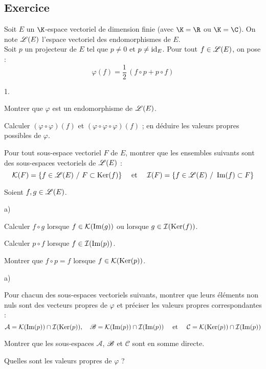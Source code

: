 \documentclass[11pt]{article}%
\begin{document}
\subsection*{Exercice} %
\noindent
Soit $E$ un $\K$-espace vectoriel de dimension finie (avec $\K=\R$ 
ou $\K=\C$). On note $\mathscr{L}(E)$ l'espace vectoriel des endomorphismes de 
$E$.\\
Soit $p$ un projecteur de $E$ tel que $p\neq 0$ et $p\neq {\rm{id}}_E$. Pour 
tout $f\in \mathscr{L}(E)$, on pose :
\[
 \varphi(f)=\dfrac{1}{2} \, (f\circ p +p\circ f)
\]
\begin{noliste}{1.}
 \item Montrer que $\varphi$ est un endomorphisme de $\mathscr{L}(E)$.
 
 \item Calculer $(\varphi \circ \varphi)(f)$ et $(\varphi \circ \varphi 
 \circ \varphi)(f)$ ; en déduire les valeurs propres possibles de 
 $\varphi$.
 
 \item Pour tout sous-espace vectoriel $F$ de $E$, montrer que les 
 ensembles suivants sont des sous-espaces vectoriels de $\mathscr{L}(E)$ :
 \[
  \mathcal{K}(F) = \{f\in \mathscr{L}(E) \ / \ F\subset \operatorname{Ker}(f)\} \quad 
  \mbox{ et } \quad \mathcal{I}(F) = \{f\in\mathscr{L}(E) \ / \ \operatorname{Im}(f) 
  \subset F\}
 \]
 
 \item Soient $f,g \in \mathscr{L}(E)$.
 \begin{noliste}{a)}
  \item Calculer $f\circ g$ lorsque $f\in \mathcal{K}(\operatorname{Im}(g))$ ou
  lorsque $g\in \mathcal{I}(\operatorname{Ker}(f))$.
  
  \item Calculer $p\circ f$ lorsque $f\in \mathcal{I}(\operatorname{Im}(p))$.
  
  \item Montrer que $f\circ p=f$ lorsque $f\in \mathcal{K}(\operatorname{Ker}(p))$.
 \end{noliste}
 
 \item 
 \begin{noliste}{a)}
  \item Pour chacun des sous-espaces vectoriels suivants, montrer que 
  leurs éléments non nuls sont des vecteurs propres de $\varphi$ et 
  préciser les valeurs propres correspondantes :
  \[
   \mathcal{A} = \mathcal{K}(\operatorname{Im}(p)) \cap \mathcal{I}(\operatorname{Ker}(p)), \quad 
   \mathscr{B} = \mathcal{K}(\operatorname{Im}(p)) \cap \mathcal{I}(\operatorname{Im}(p)) \quad \mbox{ et }
   \quad \mathcal{C} = \mathcal{K}(\operatorname{Ker}(p)) \cap \mathcal{I}(\operatorname{Im}(p))
  \]
  
  \item Montrer que les sous-espaces $\mathcal{A}$, $\mathscr{B}$ et 
  $\mathcal{C}$ sont en somme directe.
  
  \item Quelles sont les valeurs propres de $\varphi$ ?
 \end{noliste}
\end{noliste}
\end{document}
